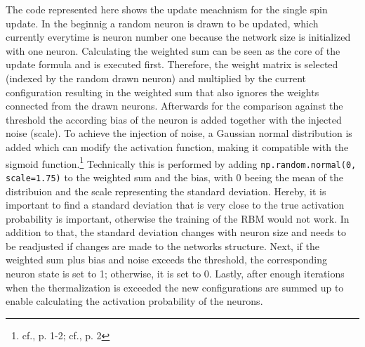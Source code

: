 The code represented here shows the update meachnism for the single spin update. 
In the beginnig a random neuron is drawn to be updated, which currently everytime is neuron number one because the network size is initialized with one neuron. 
Calculating the weighted sum can be seen as the core of the update formula and is executed first.
Therefore, the weight matrix is selected (indexed by the random drawn neuron) and multiplied by the current configuration resulting in 
the weighted sum that also ignores the weights connected from the drawn neurons.
Afterwards for the comparison against the threshold the according bias of the neuron is added together with the injected noise (scale).
To achieve the injection of noise, a Gaussian normal distribution is added which can modify the activation function, making it compatible with the sigmoid function.\footnote{cf.\cite{bohmNoiseinjectedAnalogIsing2022}, p. 1-2; cf.\cite{mahmoodiVersatileStochasticDot2019}, p. 2}
Technically this is performed by adding \texttt{np.random.normal(0, scale=1.75)} to the weighted sum and the bias, with 0 beeing the mean of the distribuion and the scale representing the standard deviation. 
Hereby, it is important to find a standard deviation that is very close to the true activation probability is important, otherwise the training of the RBM would not work.
In addition to that, the standard deviation changes with neuron size and needs to be readjusted if changes are made to the networks structure.
Next, if the weighted sum plus bias and noise exceeds the threshold, the corresponding neuron state is set to 1; otherwise, it is set to 0.
Lastly, after enough iterations when the thermalization is exceeded the new configurations
are summed up to enable calculating the activation probability of the neurons. 

